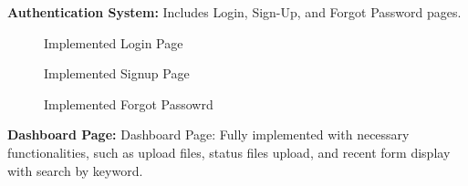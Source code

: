 \documentclass[12pt,oneside,openright,a4paper]{cpe-english-project}
\begin{document}
\textbf{Authentication System:} Includes Login, Sign-Up, and Forgot Password pages.

\begin{figure}[H]
\centering
{}
\caption{Implemented Login Page}\label{fig:auth-login}
\end{figure}

\begin{figure}[H]
\centering
{}
\caption{Implemented Signup Page}\label{fig:auth-signup}
\end{figure}

\begin{figure}[H]
\centering
{}
\caption{Implemented Forgot Passowrd}\label{fig:auth-forgotpasswd}
\end{figure}

\textbf{Dashboard Page:} Dashboard Page: Fully implemented with necessary functionalities,  such as upload files, status files upload, and recent form display with search by keyword.
\end{document}

